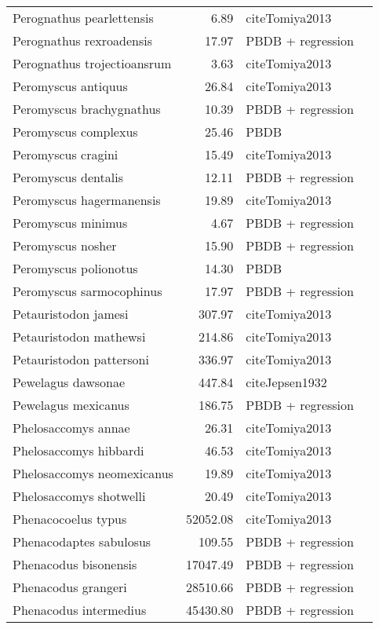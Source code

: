 \begin{table}[ht]
\begin{tabular}{lrll}
  Perognathus pearlettensis & 6.89 & cite{Tomiya2013} &  \\ 
  Perognathus rexroadensis & 17.97 & PBDB + regression &  \\ 
  Perognathus trojectioansrum & 3.63 & cite{Tomiya2013} &  \\ 
  Peromyscus antiquus & 26.84 & cite{Tomiya2013} &  \\ 
  Peromyscus brachygnathus & 10.39 & PBDB + regression &  \\ 
  Peromyscus complexus & 25.46 & PBDB &  \\ 
  Peromyscus cragini & 15.49 & cite{Tomiya2013} &  \\ 
  Peromyscus dentalis & 12.11 & PBDB + regression &  \\ 
  Peromyscus hagermanensis & 19.89 & cite{Tomiya2013} &  \\ 
  Peromyscus minimus & 4.67 & PBDB + regression &  \\ 
  Peromyscus nosher & 15.90 & PBDB + regression &  \\ 
  Peromyscus polionotus & 14.30 & PBDB &  \\ 
  Peromyscus sarmocophinus & 17.97 & PBDB + regression &  \\ 
  Petauristodon jamesi & 307.97 & cite{Tomiya2013} &  \\ 
  Petauristodon mathewsi & 214.86 & cite{Tomiya2013} &  \\ 
  Petauristodon pattersoni & 336.97 & cite{Tomiya2013} &  \\ 
  Pewelagus dawsonae & 447.84 & cite{Jepsen1932} &  \\ 
  Pewelagus mexicanus & 186.75 & PBDB + regression &  \\ 
  Phelosaccomys annae & 26.31 & cite{Tomiya2013} &  \\ 
  Phelosaccomys hibbardi & 46.53 & cite{Tomiya2013} &  \\ 
  Phelosaccomys neomexicanus & 19.89 & cite{Tomiya2013} &  \\ 
  Phelosaccomys shotwelli & 20.49 & cite{Tomiya2013} &  \\ 
  Phenacocoelus typus & 52052.08 & cite{Tomiya2013} &  \\ 
  Phenacodaptes sabulosus & 109.55 & PBDB + regression &  \\ 
  Phenacodus bisonensis & 17047.49 & PBDB + regression &  \\ 
  Phenacodus grangeri & 28510.66 & PBDB + regression &  \\ 
  Phenacodus intermedius & 45430.80 & PBDB + regression &  \\ 

\end{tabular}
\end{table}
